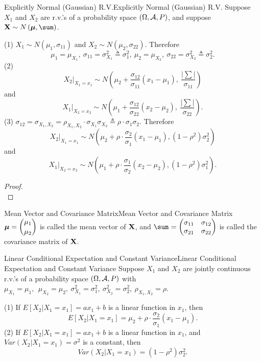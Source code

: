 \documentclass{elegantbook}
\begin{document}
\begin{theorem}{Explicitly Normal (Gaussian) R.V.}{Explicitly Normal (Gaussian) R.V.}
Suppose \(X_{1}\) and \(X_{2}\) are r.v.'s of a probability space $(\Omega,\mathcal{A}, P)$, and suppose \(\mX\sim N\left(\bm{\mu} ,\sum \right)\).

(1) \(X_{1}\sim N\left( \mu_{1},\sigma_{11} \right)\) and
\(X_{2}\sim N\left( \mu_{2},\sigma_{22} \right)\). Therefore
\[\mu_{1} = \mu_{X_{1}},\ \sigma_{11} = \sigma_{X_{1}}^{2} \triangleq \sigma_{1}^{2},\ \mu_{2} = \mu_{X_{2}},\ \sigma_{22} = \sigma_{X_{2}}^{2} \triangleq \sigma_{2}^{2}.\]
(2)
\[X_{2}|_{X_{1} = x_{1}}\sim N\left( \mu_{2} + \frac{\sigma_{12}}{\sigma_{11}}\left( x_{1} - \mu_{1} \right),\ \frac{\left| \sum \right|}{\sigma_{11}} \right)\]
and
\[X_{1}|_{X_{2} = x_{2}}\sim N\left( \mu_{1} + \frac{\sigma_{12}}{\sigma_{22}}\left( x_{2} - \mu_{2} \right),\ \frac{\left|\sum\right|}{\sigma_{22}} \right).\]
(3)
\(\sigma_{12} = \sigma_{X_{1},X_{2}} = \rho_{X_{1},X_{2}} \cdot \sigma_{X_{1}}\sigma_{X_{2}} \triangleq \rho \cdot \sigma_{1}\sigma_{2}\). Therefore
\[X_{2}|_{X_{1} = x_{1}}\sim N\left( \mu_{2} + \rho\cdot\frac{\sigma_{2}}{\sigma_{1}}\left( x_{1} - \mu_{1} \right),\left(1 - \rho^{2}\right)\sigma_{2}^{2} \right)\]
and
\[X_{1}|_{X_{2} = x_{2}}\sim N\left( \mu_{1} + \rho\cdot\frac{\sigma_{1}}{\sigma_{2}}\left( x_{2} - \mu_{2} \right),\left(1 - \rho^{2}\right)\sigma_{1}^{2} \right).\]
\end{theorem}

\begin{proof}
\\[4cm]\vspace{0.01cm}
\end{proof}

\begin{remark}{Mean Vector and Covariance Matrix}{Mean Vector and Covariance Matrix}
\(\displaystyle\bm{\mu}= \binom{\mu_{1}}{\mu_{2}}\) is called the mean vector of $\mathbf{X}$, and \(\dis\sum_{}^{} = \begin{pmatrix}
\sigma_{11} & \sigma_{12} \\
\sigma_{21} & \sigma_{22} \\
\end{pmatrix}\) is called the covariance matrix of $\mathbf{X}$.
\end{remark}

\begin{lemma}{Linear Conditional Expectation and Constant Variance}{Linear Conditional Expectation and Constant Variance}
Suppose \(X_{1}\) and \(X_{2}\) are jointly continuous r.v.'s of a probability
space $(\Omega,\mathcal{A}, P)$ with \(\mu_{X_{1}} = \mu_{1},\ \ \mu_{X_{2}} = \mu_{2},\ \sigma_{X_{1}}^{2} = \sigma_{1}^{2},\ \sigma_{X_{2}}^{2} = \sigma_{2}^{2},\ \rho_{X_{1},X_{2}} = \rho\).

(1) If
\(E[ X_{2} | X_{1} = x_{1} ] = ax_{1} + b\)
is a linear function in \(x_{1}\), then
\[E[ X_{2} | X_{1} = x_{1} ] = \mu_{2} + \rho\cdot\frac{\sigma_{2}}{\sigma_{1}}\left( x_{1} - \mu_{1} \right).\]
(2) If
\(E[ X_{2} | X_{1} = x_{1} ]= ax_{1} + b\)
is a linear function in \(x_{1}\), and
\(Var( X_{2}| X_{1} = x_{1} ) = \sigma^{2}\)
is a constant, then
\[Var( X_{2} | X_{1} = x_{1} ) = \left( 1 - \rho^{2} \right)\sigma_{2}^{2}.\]
\end{lemma}
\end{document}

